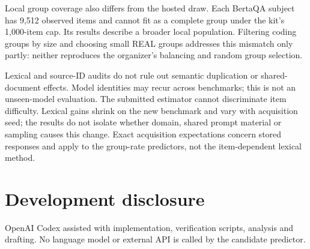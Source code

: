 \documentclass{article}
\begin{document}
Local group coverage also differs from the hosted draw. Each BertaQA subject has 9,512 observed items and cannot fit as a complete group under the kit's 1,000-item cap. Its results describe a broader local population. Filtering coding groups by size and choosing small REAL groups addresses this mismatch only partly: neither reproduces the organizer's balancing and random group selection.

Lexical and source-ID audits do not rule out semantic duplication or shared-document effects. Model identities may recur across benchmarks; this is not an unseen-model evaluation. The submitted estimator cannot discriminate item difficulty. Lexical gains shrink on the new benchmark and vary with acquisition seed; the results do not isolate whether domain, shared prompt material or sampling causes this change. Exact acquisition expectations concern stored responses and apply to the group-rate predictors, not the item-dependent lexical method.

\section*{Development disclosure}\label{development-disclosure}

OpenAI Codex assisted with implementation, verification scripts, analysis and drafting. No language model or external API is called by the candidate predictor.
\end{document}
